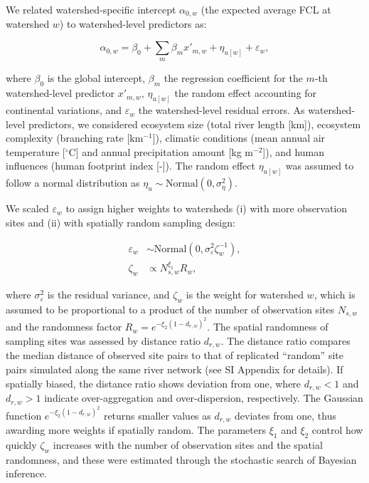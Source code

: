 \documentclass[11pt, class=article, crop=false]{standalone}
\begin{document}
We related watershed-specific intercept $\alpha_{0, w}$ (the expected average FCL at watershed $w$) to watershed-level predictors as:

\begin{equation}
    \alpha_{0, w} = \beta_0 + \sum_m \beta_m x'_{m, w} + \eta_{u[w]} + \varepsilon_{w},
\end{equation}

where $\beta_0$ is the global intercept, $\beta_m$ the regression coefficient for the $m$-th watershed-level predictor $x'_{m, w}$, $\eta_{u[w]}$ the random effect accounting for continental variations, and $\varepsilon_w$ the watershed-level residual errors.
As watershed-level predictors, we considered ecosystem size (total river length [km]), ecosystem complexity (branching rate [km$^{-1}$]), climatic conditions (mean annual air temperature [$^\circ$C] and annual precipitation amount [kg m$^{-2}$]), and human influences (human footprint index [-]).
The random effect $\eta_{u[w]}$ was assumed to follow a normal distribution as $\eta_{u} \sim \mbox{Normal}(0, \sigma_{\eta}^2)$.

We scaled $\varepsilon_w$ to assign higher weights to watersheds (i) with more observation sites and (ii) with spatially random sampling design:

\begin{align}
    \varepsilon_w &\sim \mbox{Normal}(0, \sigma_{\varepsilon}^2 \zeta_w^{-1}),\\
    \zeta_w &\propto N_{s, w}^{\xi_1} R_w,
\end{align}

where $\sigma_{\varepsilon}^2$ is the residual variance, and $\zeta_w$ is the weight for watershed $w$, which is assumed to be proportional to a product of the number of observation sites $N_{s,w}$ and the randomness factor $R_w = e^{-\xi_2 (1 - d_{r,w})^2}$.
The spatial randomness of sampling sites was assessed by distance ratio $d_{r, w}$.
The distance ratio compares the median distance of observed site pairs to that of replicated ``random'' site pairs simulated along the same river network (see SI Appendix for details).
If spatially biased, the distance ratio shows deviation from one, where $d_{r, w} < 1$ and $d_{r, w} > 1$ indicate over-aggregation and over-dispersion, respectively.
The Gaussian function $e^{-\xi_2 (1 - d_{r,w})^2}$ returns smaller values as $d_{r, w}$ deviates from one, thus awarding more weights if spatially random.
The parameters $\xi_1$ and $\xi_2$ control how quickly $\zeta_w$ increases with the number of observation sites and the spatial randomness, and these were estimated through the stochastic search of Bayesian inference.
\end{document}
